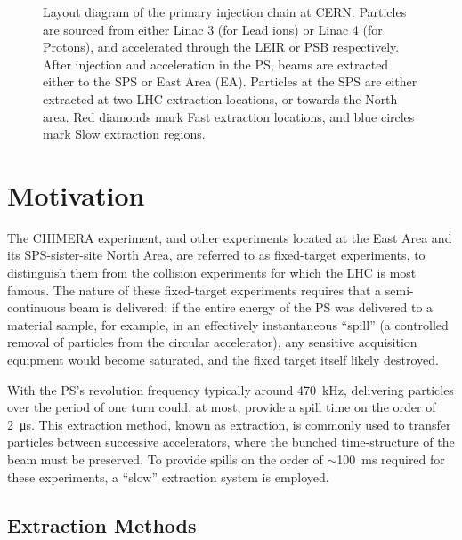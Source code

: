 \documentclass[11pt]{report}
\begin{document}
\begin{figure}
\caption{Layout diagram of the primary injection chain at CERN. Particles are sourced from either Linac 3 (for Lead ions) or Linac 4 (for Protons), and accelerated through the LEIR or PSB respectively. After injection and acceleration in the PS, beams are extracted either to the SPS or East Area (EA). Particles at the SPS are either extracted at two LHC extraction locations, or towards the North area. Red diamonds mark Fast extraction locations, and blue circles mark Slow extraction regions.}
\label{fig:chain}
\end{figure}

\section{Motivation}

The CHIMERA experiment, and other experiments located at the East Area and its SPS-sister-site North Area, are referred to as fixed-target experiments, to distinguish them from the collision experiments for which the LHC is most famous. The nature of these fixed-target experiments requires that a semi-continuous beam is delivered: if the entire energy of the PS was delivered to a material sample, for example, in an effectively instantaneous ``spill'' (a controlled removal of particles from the circular accelerator), any sensitive acquisition equipment would become saturated, and the fixed target itself likely destroyed.


With the PS's revolution frequency typically around \qty{470}{kHz}, delivering particles over the period of one turn could, at most, provide a spill time on the order of \qty{2}{\micro\second}. This extraction method, known as  extraction, is commonly used to transfer particles between successive accelerators, where the bunched time-structure of the beam must be preserved. To provide spills on the order of $\sim$\qty{100}{\ms} required for these experiments, a ``slow'' extraction system is employed.

\subsection{Extraction Methods}
\end{document}

